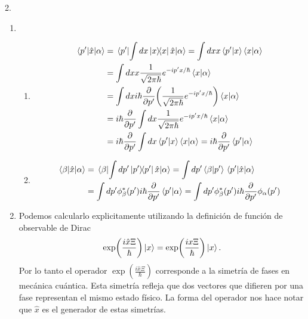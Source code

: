 \documentclass{article}
\begin{document}
2.\begin{enumerate}
\item \begin{enumerate}
\item \begin{align}
\begin{split}
\mel{p'}{\hat{x}}{\alpha}&=\mel{p'}{\int dx \dyad{x}\hat{x}}{\alpha}=\int dx  x \ip{p'}{x}\ip{x}{\alpha}\\
&=\int dx x\frac{1}{\sqrt{2\pi\hbar}}e^{-ip'x/\hbar}\ip{x}{\alpha}\\
&=\int dx i\hbar\frac{\partial}{\partial p'}\qty(\frac{1}{\sqrt{2\pi\hbar}}e^{-ip'x/\hbar})\ip{x}{\alpha}\\
&=i\hbar\frac{\partial}{\partial p'}\int dx \frac{1}{\sqrt{2\pi\hbar}}e^{-ip'x/\hbar}\ip{x}{\alpha}\\
&=i\hbar\frac{\partial}{\partial p'}\int dx \ip{p'}{x}\ip{x}{\alpha}=i\hbar\frac{\partial}{\partial p'}\ip{p'}{\alpha}\\
\end{split}
\end{align}
\item\begin{align}
\begin{split}
\mel{\beta}{\hat{x}}{\alpha}&=\mel{\beta}{\int dp'\dyad{p'}\hat{x}}{\alpha}=\int dp'\ip{\beta}{p'}\mel{p'}{\hat{x}}{\alpha}\\
&=\int dp'\phi_\beta^*(p')i\hbar\frac{\partial}{\partial p'}\ip{p'}{\alpha}=\int dp'\phi_\beta^*(p')i\hbar\frac{\partial}{\partial p'}\phi_\alpha(p')
\end{split}
\end{align}
\end{enumerate}
\item Podemos calcularlo explicitamente utilizando la definición de función de observable de Dirac
\begin{equation}
\exp(\frac{i\hat{x}\Xi}{\hbar})\ket{x}=\exp(\frac{ix\Xi}{\hbar})\ket{x}.
\end{equation}
Por lo tanto el operador $\exp(\frac{i\hat{x}\Xi}{\hbar})$ corresponde a la simetría de fases en mecánica cuántica. Esta simetría refleja que dos vectores que difieren por una fase representan el mismo estado físico. La forma del operador nos hace notar que $\hat{x}$ es el generador de estas simetrías. 
\end{enumerate}
\end{document}
